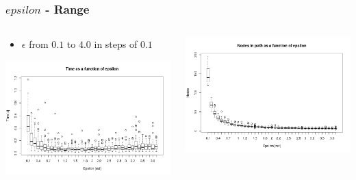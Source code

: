 \documentclass{beamer}
\begin{document}
\begin{frame}
  \frametitle{$epsilon$ - Range}
  \begin{columns}
    \begin{column}{0.5\textwidth}
      \begin{itemize}
      \item $\epsilon$ from $0.1$ to $4.0$ in steps of $0.1$
      \end{itemize}
      \begin{center}
        \includegraphics[width=\textwidth]{./time_v_eps_full}
      \end{center}
    \end{column}
    \begin{column}{0.5\textwidth}
      \begin{center}
        \includegraphics[width=\textwidth]{./nodes_v_eps_full}

\end{center}
\end{column}
\end{columns}
\end{frame}
\end{document}
